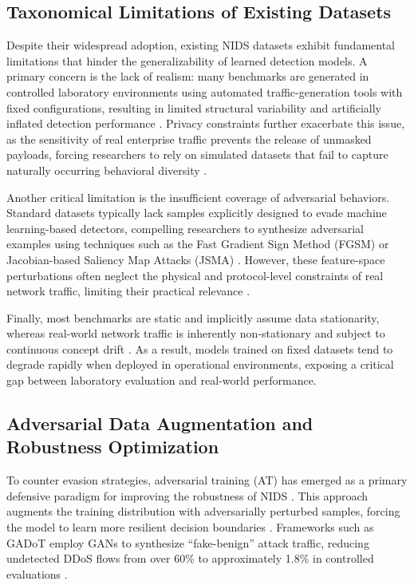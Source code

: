 \subsection{Taxonomical Limitations of Existing Datasets}

Despite their widespread adoption, existing NIDS datasets exhibit fundamental limitations that hinder the generalizability of learned detection models. 
A primary concern is the lack of realism: many benchmarks are generated in controlled laboratory environments using automated traffic-generation tools with fixed configurations, resulting in limited structural variability and artificially inflated detection performance \cite{guo2025knowml}. 
Privacy constraints further exacerbate this issue, as the sensitivity of real enterprise traffic prevents the release of unmasked payloads, forcing researchers to rely on simulated datasets that fail to capture naturally occurring behavioral diversity \cite{he2023adversarial}.

Another critical limitation is the insufficient coverage of adversarial behaviors. 
Standard datasets typically lack samples explicitly designed to evade machine learning-based detectors, compelling researchers to synthesize adversarial examples using techniques such as the Fast Gradient Sign Method (FGSM) or Jacobian-based Saliency Map Attacks (JSMA) \cite{sarikaya2023raids}. 
However, these feature-space perturbations often neglect the physical and protocol-level constraints of real network traffic, limiting their practical relevance \cite{hashemi2020enhancing}.

Finally, most benchmarks are static and implicitly assume data stationarity, whereas real-world network traffic is inherently non-stationary and subject to continuous concept drift \cite{apruzzese2024adversarial}. 
As a result, models trained on fixed datasets tend to degrade rapidly when deployed in operational environments, exposing a critical gap between laboratory evaluation and real-world performance.



\subsection{Adversarial Data Augmentation and Robustness Optimization}

To counter evasion strategies, adversarial training (AT) has emerged as a primary defensive paradigm for improving the robustness of NIDS \cite{bountakas2023defense}. 
This approach augments the training distribution with adversarially perturbed samples, forcing the model to learn more resilient decision boundaries \cite{roshan2024boosting}. 
Frameworks such as GADoT employ GANs to synthesize ``fake-benign'' attack traffic, reducing undetected DDoS flows from over 60\% to approximately 1.8\% in controlled evaluations \cite{abdelaty2021gadot}.

